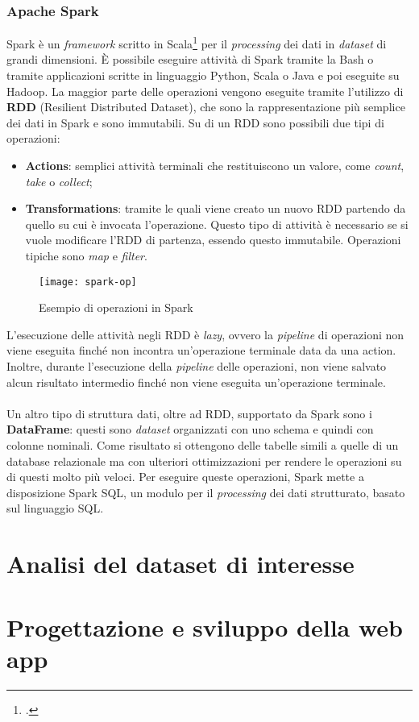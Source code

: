 \subsubsection{Apache Spark}
Spark è un \textit{framework} scritto in Scala\footcite{https://www.scala-lang.org/} per il \textit{processing} dei dati in \textit{dataset} di grandi dimensioni.
È possibile eseguire attività di Spark tramite la \gls{Bash} o tramite applicazioni scritte in linguaggio Python, Scala o Java e poi eseguite su Hadoop.
La maggior parte delle operazioni vengono eseguite tramite l'utilizzo di \textbf{RDD} (Resilient Distributed Dataset), che sono la rappresentazione più semplice dei dati in Spark e sono immutabili. Su di un RDD sono possibili due tipi di operazioni:
\begin{itemize}
	\item \textbf{Actions}: semplici attività terminali che restituiscono un valore, come \textit{count}, \textit{take} o \textit{collect}; 
	\item \textbf{Transformations}: tramite le quali viene creato un nuovo RDD partendo da quello su cui è invocata l'operazione. Questo tipo di attività è necessario se si vuole modificare l'RDD di partenza, essendo questo immutabile. Operazioni tipiche sono \textit{map} e \textit{filter}.
\end{itemize}
\begin{figure}[!h]
	\centering
	\texttt{[image: spark-op]}
	\caption{Esempio di operazioni in Spark}
\end{figure}
L'esecuzione delle attività negli RDD è \textit{lazy}, ovvero la \textit{pipeline} di operazioni non viene eseguita finché non incontra un'operazione terminale data da una action. Inoltre, durante l'esecuzione della \textit{pipeline} delle operazioni, non viene salvato alcun risultato intermedio finché non viene eseguita un'operazione terminale.\\\\

Un altro tipo di struttura dati, oltre ad RDD, supportato da Spark sono i \textbf{DataFrame}: questi sono \textit{dataset} organizzati con uno schema e quindi con colonne nominali. Come risultato si ottengono delle tabelle simili a quelle di un database relazionale ma con ulteriori ottimizzazioni per rendere le operazioni su di questi molto più veloci. Per eseguire queste operazioni, Spark mette a disposizione Spark SQL, un modulo per il \textit{processing} dei dati strutturato, basato sul linguaggio SQL.
\newpage
\section{Analisi del dataset di interesse} \label{dataset}


\section{Progettazione e sviluppo della web app}
